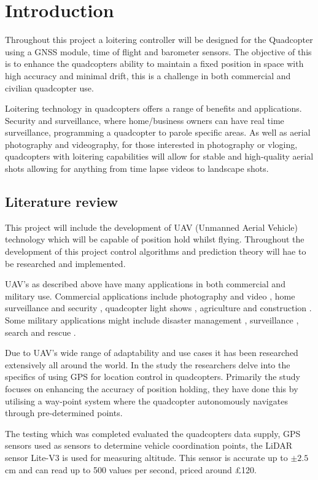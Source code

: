 \documentclass{report}
\begin{document}
\chapter{Introduction}
Throughout this project a loitering controller will be designed for the
Quadcopter using a GNSS module, time of flight and barometer sensors. The objective of this is to enhance the quadcopters ability to maintain a fixed position in space with high accuracy and minimal drift, this is a challenge in both commercial and civilian quadcopter use.

Loitering technology in quadcopters offers a range of benefits and applications.
Security and surveillance, where home/business owners can have real time
surveillance, programming a quadcopter to parole specific areas. As well as
aerial photography and videography, for those interested in photography or
vloging, quadcopters with loitering capabilities will allow for stable and
high-quality aerial shots allowing for anything from time lapse videos to
landscape shots.

\section{Literature review}
This project will include the development of UAV (Unmanned Aerial
Vehicle) technology which will be capable of position hold whilst flying.
Throughout the development of this project control algorithms and prediction theory will hae to be researched and implemented.

UAV's as described above have many applications in both commercial and military
use. Commercial applications include photography and video
\cite{photographyAndVideo}, home surveillance and security \cite{security},
quadcopter light shows \cite{lightShow}, agriculture \cite{agricultural} and
construction \cite{construction}. Some military applications might include
disaster management \cite{disasterManagement}, surveillance \cite{surveillance},
search and rescue \cite{searchAndRescue}.

Due to UAV's wide range of adaptability and use cases it has been researched
extensively all around the world. In the study \cite{Widhianto2023Quadcopter}
the researchers delve into the specifics of using GPS for location control in
quadcopters. Primarily the study focuses on enhancing the accuracy of position
holding, they have done this by utilising a way-point system where the
quadcopter autonomously navigates through pre-determined points.

The testing which was completed evaluated the quadcopters data supply, GPS
sensors used as sensors to determine vehicle coordination points, the LiDAR
sensor Lite-V3 is used for measuring altitude. This sensor is accurate up to \(\pm 2.5\)cm and can read up to 500 values per second, priced around £120.
\end{document}
